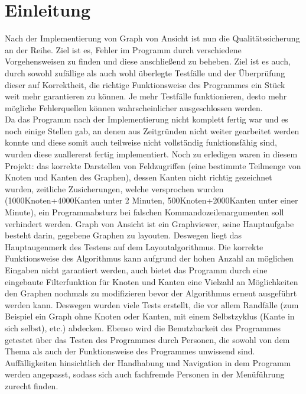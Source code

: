 \chapter{Einleitung}
\label{ch:einleitung}

Nach der Implementierung von Graph von Ansicht ist nun die Qualitätssicherung an der Reihe. Ziel ist es, Fehler im Programm durch verschiedene Vorgehensweisen zu finden und diese anschließend zu beheben. Ziel ist es auch, durch sowohl zufällige als auch wohl überlegte Testfälle und der Überprüfung dieser auf Korrektheit, die richtige Funktionsweise des Programmes ein Stück weit mehr garantieren zu können. Je mehr Testfälle funktionieren, desto mehr mögliche Fehlerquellen können wahrscheinlicher ausgeschlossen werden.\\%
Da das Programm nach der Implementierung nicht komplett fertig war und es noch einige Stellen gab, an denen aus Zeitgründen nicht weiter gearbeitet werden konnte und diese somit auch teilweise nicht vollständig funktionsfähig sind, wurden diese zuallererst fertig implementiert. Noch zu erledigen waren in diesem Projekt: das korrekte Darstellen von Feldzugriffen (eine bestimmte Teilmenge von Knoten und Kanten des Graphen), dessen Kanten nicht richtig gezeichnet wurden, zeitliche Zusicherungen, welche versprochen wurden (1000Knoten+4000Kanten unter 2 Minuten, 500Knoten+2000Kanten unter einer Minute), ein Programmabsturz bei falschen Kommandozeilenargumenten soll verhindert werden.
Graph von Ansicht ist ein Graphviewer, seine Hauptaufgabe besteht darin, gegebene Graphen zu layouten. Deswegen liegt das Hauptaugenmerk des Testens auf dem Layoutalgorithmus. Die korrekte Funktionsweise des Algorithmus kann aufgrund der hohen Anzahl an möglichen Eingaben nicht garantiert werden, auch bietet das Programm durch eine eingebaute Filterfunktion für Knoten und Kanten eine Vielzahl an Möglichkeiten den Graphen nochmals zu modifizieren bevor der Algorithmus erneut ausgeführt werden kann. Deswegen wurden viele Tests erstellt, die vor allem Randfälle (zum Beispiel ein Graph ohne Knoten oder Kanten, mit einem Selbstzyklus (Kante in sich selbst), etc.) abdecken.
Ebenso wird die Benutzbarkeit des Programmes getestet über das Testen des Programmes durch Personen, die sowohl von dem Thema als auch der Funktionsweise des Programmes unwissend sind. Auffälligkeiten hinsichtlich der Handhabung und Navigation in dem Programm werden angepasst, sodass sich auch fachfremde Personen in der Menüführung zurecht finden.



